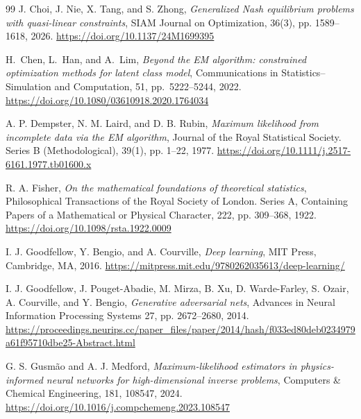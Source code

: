 \documentclass[pdflatex,sn-mathphys-num]{sn-jnl}%
\theoremstyle{thmstyleone}%
\theoremstyle{thmstyletwo}%
\theoremstyle{thmstylethree}%
\begin{document}
\begin{thebibliography}{99}
{\sc J. Choi, J. Nie, X. Tang, and S. Zhong},
{\em Generalized Nash equilibrium problems with quasi-linear constraints},
SIAM Journal on Optimization, 36(3), pp. 1589--1618, 2026.
\url{https://doi.org/10.1137/24M1699395}



{\sc H.~Chen, L.~Han, and A.~Lim},
{\em Beyond the EM algorithm: constrained optimization methods for latent class model},
Communications in Statistics--Simulation and Computation, 51,
pp.~5222--5244, 2022.
\url{https://doi.org/10.1080/03610918.2020.1764034}

{\sc A. P. Dempster, N. M. Laird, and D. B. Rubin},
{\em Maximum likelihood from incomplete data via the EM algorithm},
Journal of the Royal Statistical Society. Series B (Methodological),
39(1), pp. 1--22, 1977.
\url{https://doi.org/10.1111/j.2517-6161.1977.tb01600.x}

{\sc R. A. Fisher},
{\em On the mathematical foundations of theoretical statistics},
Philosophical Transactions of the Royal Society of London. Series A, Containing Papers of a Mathematical or Physical Character, 222, pp. 309--368, 1922.
\url{https://doi.org/10.1098/rsta.1922.0009}

{\sc I. J. Goodfellow, Y. Bengio, and A. Courville},
{\em Deep learning}, MIT Press, Cambridge, MA, 2016.
\url{https://mitpress.mit.edu/9780262035613/deep-learning/}

{\sc I. J. Goodfellow, J. Pouget-Abadie, M. Mirza, B. Xu, D. Warde-Farley, S. Ozair, A. Courville, and Y. Bengio},
{\em Generative adversarial nets},
Advances in Neural Information Processing Systems 27,
pp. 2672--2680, 2014.
\url{https://proceedings.neurips.cc/paper_files/paper/2014/hash/f033ed80deb0234979a61f95710dbe25-Abstract.html}



{\sc G. S. Gusmão and A. J. Medford},
{\em Maximum-likelihood estimators in physics-informed neural networks for high-dimensional inverse problems}, Computers \& Chemical Engineering, 181, 108547, 2024.
\url{https://doi.org/10.1016/j.compchemeng.2023.108547}


\end{thebibliography}
\end{document}
